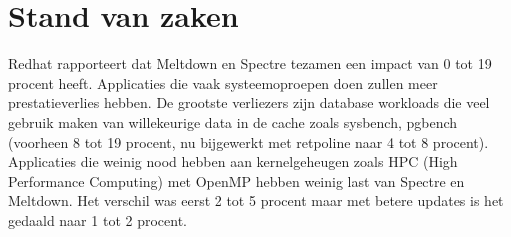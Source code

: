 \chapter{Stand van zaken}
\label{ch:stand-van-zaken}









Redhat rapporteert dat Meltdown en Spectre tezamen een impact van 0 tot 19 procent heeft.
Applicaties die vaak systeemoproepen doen zullen meer prestatieverlies hebben. 
De grootste verliezers zijn database workloads die veel gebruik maken van willekeurige data in de cache zoals sysbench, pgbench (voorheen 8 tot 19 procent, nu bijgewerkt met retpoline naar 4 tot 8 procent).
Applicaties die weinig nood hebben aan kernelgeheugen zoals HPC (High Performance Computing) met OpenMP hebben weinig last van Spectre en Meltdown. Het verschil was eerst 2 tot 5 procent maar met betere updates is het gedaald naar 1 tot 2 procent.



